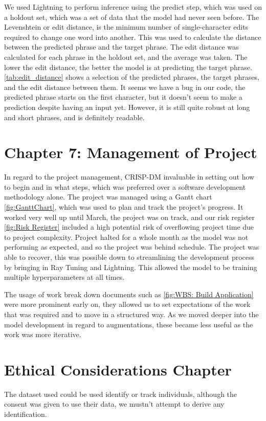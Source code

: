 \documentclass[preprint,11pt,review,authoryear]{elsarticle}
\begin{document}
We used Lightning to perform inference using the predict step, which was used on a holdout set, which was a set of data that the model had never seen before. The Levenshtein or edit distance, is the minimum number of single-character edits required to change one word into another. This was used to calculate the distance between the predicted phrase and the target phrase. The edit distance was calculated for each phrase in the holdout set, and the average was taken. The lower the edit distance, the better the model is at predicting the target phrase. \ref{tab:edit_distance} shows a selection of the predicted phrases, the target phrases, and the edit distance between them. It seems we have a bug in our code, the predicted phrase starts on the first character, but it doesn't seem to make a prediction despite having an input yet. However, it is still quite robust at long and short phrases, and is definitely readable.



\section{Chapter 7: Management of Project}

In regard to the project management, CRISP-DM invaluable in setting out how to begin and in what steps, which was preferred over a software development methodology alone. The project was managed using a Gantt chart \ref{fig:GanttChart}, which was used to plan and track the project's progress. It worked very well up until March, the project was on track, and our risk register \ref{fig:Risk Register} included a high potential risk of overflowing project time due to project complexity. Project halted for a whole month as the model was not performing as expected, and so the project was behind schedule. The project was able to recover, this was possible down to streamlining the development process by bringing in Ray Tuning and Lightning. This allowed the model to be training multiple hyperparameters at all times.

The usage of work break down documents such as \ref{fig:WBS: Build Application} were more prominent early on, they allowed us to set expectations of the work that was required and to move in a structured way. As we moved deeper into the model development in regard to augmentations, these became less useful as the work was more iterative.

\section{Ethical Considerations Chapter}
The dataset used could be used identify or track individuals, although the consent was given to use their data, we mustn't attempt to derive any identification.
\end{document}
